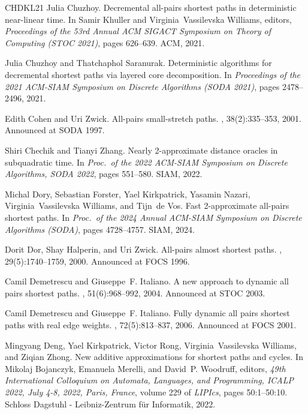 \documentclass[11pt]{article}
\theoremstyle{definition}
\theoremstyle{remark}
\begin{document}
\begin{thebibliography}{CHDKL21}
Julia Chuzhoy.
\newblock Decremental all-pairs shortest paths in deterministic near-linear
  time.
\newblock In Samir Khuller and Virginia~Vassilevska Williams, editors, {\em
  Proceedings of the 53rd Annual {ACM} {SIGACT} Symposium on Theory of
  Computing ({STOC} 2021)}, pages 626--639. {ACM}, 2021.

Julia Chuzhoy and Thatchaphol Saranurak.
\newblock Deterministic algorithms for decremental shortest paths via layered
  core decomposition.
\newblock In {\em Proceedings of the 2021 {ACM-SIAM} Symposium on Discrete
  Algorithms ({SODA} 2021)}, pages 2478--2496, 2021.

Edith Cohen and Uri Zwick.
\newblock All-pairs small-stretch paths.
, 38(2):335--353, 2001.
\newblock Announced at {SODA} 1997.

Shiri Chechik and Tianyi Zhang.
\newblock Nearly 2-approximate distance oracles in subquadratic time.
\newblock In {\em Proc.\ of the 2022 {ACM-SIAM} Symposium on Discrete
  Algorithms, {SODA} 2022}, pages 551--580. {SIAM}, 2022.

Michal Dory, Sebastian Forster, Yael Kirkpatrick, Yasamin Nazari,
  Virginia~Vassilevska Williams, and Tijn~de Vos.
\newblock Fast 2-approximate all-pairs shortest paths.
\newblock In {\em Proc.\ of the 2024 Annual ACM-SIAM Symposium on Discrete
  Algorithms (SODA)}, pages 4728--4757. SIAM, 2024.

Dorit Dor, Shay Halperin, and Uri Zwick.
\newblock All-pairs almost shortest paths.
, 29(5):1740--1759, 2000.
\newblock Announced at {FOCS} 1996.

Camil Demetrescu and Giuseppe~F. Italiano.
\newblock A new approach to dynamic all pairs shortest paths.
, 51(6):968--992, 2004.
\newblock Announced at {STOC} 2003.

Camil Demetrescu and Giuseppe~F. Italiano.
\newblock Fully dynamic all pairs shortest paths with real edge weights.
, 72(5):813--837, 2006.
\newblock Announced at {FOCS} 2001.

Mingyang Deng, Yael Kirkpatrick, Victor Rong, Virginia~Vassilevska Williams,
  and Ziqian Zhong.
\newblock New additive approximations for shortest paths and cycles.
\newblock In Mikolaj Bojanczyk, Emanuela Merelli, and David~P. Woodruff,
  editors, {\em 49th International Colloquium on Automata, Languages, and
  Programming, {ICALP} 2022, July 4-8, 2022, Paris, France}, volume 229 of {\em
  LIPIcs}, pages 50:1--50:10. Schloss Dagstuhl - Leibniz-Zentrum f{\"{u}}r
  Informatik, 2022.


\end{thebibliography}
\end{document}
